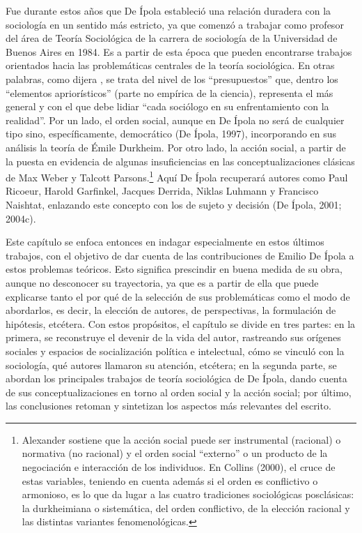 Fue durante estos años que De Ípola estableció una relación duradera con la sociología en un sentido más estricto, ya que comenzó a trabajar como profesor del área de Teoría Sociológica de la carrera de sociología de la Universidad de Buenos Aires en 1984. Es a partir de esta época que pueden encontrarse trabajos orientados hacia las problemáticas centrales de la teoría sociológica. En otras palabras, como dijera \textcite[18]{1516-ALEXANDER2008}, se trata del nivel de los \enquote{presupuestos} que, dentro los \enquote{elementos apriorísticos} (parte no empírica de la ciencia), representa el más general y con el que debe lidiar \enquote{cada sociólogo en su enfrentamiento con la realidad}. Por un lado, el orden social, aunque en De Ípola no será de cualquier tipo sino, específicamente, democrático \parencite{1540-PORTANTIERO1987}(De Ípola, 1997), incorporando en sus análisis la teoría de Émile Durkheim. Por otro lado, la acción social, a partir de la puesta en evidencia de algunas insuficiencias en las conceptualizaciones clásicas de Max Weber y Talcott Parsons.\footnote{Alexander sostiene que la acción social puede ser instrumental (racional) o normativa (no racional) y el orden social \enquote{externo} o un producto de la negociación e interacción de los individuos. En Collins (2000), el cruce de estas variables, teniendo en cuenta además si el orden es conflictivo o armonioso, es lo que da lugar a las cuatro tradiciones sociológicas posclásicas: la durkheimiana o sistemática, del orden conflictivo, de la elección racional y las distintas variantes fenomenológicas.} Aquí De Ípola recuperará autores como Paul Ricoeur, Harold Garfinkel, Jacques Derrida, Niklas Luhmann y Francisco Naishtat, enlazando este concepto con los de sujeto y decisión (De Ípola, 2001; 2004c).

Este capítulo se enfoca entonces en indagar especialmente en estos últimos trabajos, con el objetivo de dar cuenta de las contribuciones de Emilio De Ípola a estos problemas teóricos. Esto significa prescindir en buena medida de su obra, aunque no desconocer su trayectoria, ya que es a partir de ella que puede explicarse tanto el por qué de la selección de sus problemáticas como el modo de abordarlos, es decir, la elección de autores, de perspectivas, la formulación de hipótesis, etcétera. Con estos propósitos, el capítulo se divide en tres partes: en la primera, se reconstruye el devenir de la vida del autor, rastreando sus orígenes sociales y espacios de socialización política e intelectual, cómo se vinculó con la sociología, qué autores llamaron su atención, etcétera; en la segunda parte, se abordan los principales trabajos de teoría sociológica de De Ípola, dando cuenta de sus conceptualizaciones en torno al orden social y la acción social; por último, las conclusiones retoman y sintetizan los aspectos más relevantes del escrito.

